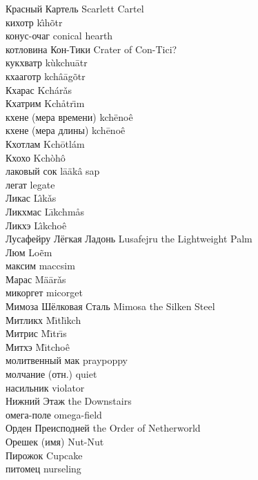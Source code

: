 \documentclass[a4paper,10pt]{book}
\begin{document}
Красный Картель \hfill Scarlett Cartel\\
кихотр \hfill k\^{\i}h\~{o}tr\\
конус-очаг \hfill conical hearth\\
котловина Кон-Тики \hfill Crater of Con-Tici?\\
кукхватр \hfill k\`{u}kchu\={a}tr\\
кхааготр \hfill kch\^{a}\={a}g\~{o}tr\\
Кхарас \hfill Kch\'{a}r\v{a}s\\
Кхатрим \hfill Kch\r{a}tr\"{\i}m\\
кхене (мера времени) \hfill kch\"{e}no\^{e}\\
кхене (мера длины) \hfill kch\={e}no\^{e}\\
Кхотлам \hfill Kch\={o}tl\'{a}m\\
Кхохо \hfill Kch\`{o}h\^{o}\\
лаковый сок \hfill l\={a}\"{a}k\^{a} sap\\
легат \hfill legate\\
Ликас \hfill L\^{\i}k\v{a}s\\
Ликхмас \hfill L\={\i}kchm\r{a}s\\
Ликхэ \hfill L\^{\i}kcho\^{e}\\
Лусафейру Лёгкая Ладонь \hfill Lusafejru the Lightweight Palm\\
Люм \hfill Lo\~{e}m\\
максим \hfill maccsim\\
Марас \hfill M\"{a}\={a}r\v{a}s\\
микоргет \hfill micorget\\
Мимоза Шёлковая Сталь \hfill Mimosa the Silken Steel\\
Митликх \hfill M\={\i}tl\={\i}kch\\
Митрис \hfill M\={\i}tr\={\i}s\\
Митхэ \hfill M\={\i}tcho\^{e}\\
молитвенный мак \hfill praypoppy\\
молчание (отн.) \hfill quiet\\
насильник \hfill violator\\
Нижний Этаж \hfill the Downstairs\\
омега-поле \hfill omega-field\\
Орден Преисподней \hfill the Order of Netherworld\\
Орешек (имя) \hfill Nut-Nut\\
Пирожок \hfill Cupcake\\
питомец \hfill nurseling\\
\end{document}
